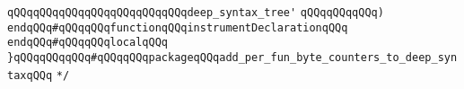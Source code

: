 \verb|qQQqqQQqqQQqqQQqqQQqqQQqqQQqdeep_syntax_tree'|\newline
\verb|qQQqqQQqqQQq)|\newline
\newline
\verb|endqQQq#qQQqqQQqfunctionqQQqinstrumentDeclarationqQQq|\newline
\newline
\verb|endqQQq#qQQqqQQqlocalqQQq|\newline
\verb|}qQQqqQQqqQQq#qQQqqQQqpackageqQQqadd_per_fun_byte_counters_to_deep_syntaxqQQq|\newline
\verb|*/|\newline
\newline
\newline
\newline
\newline

